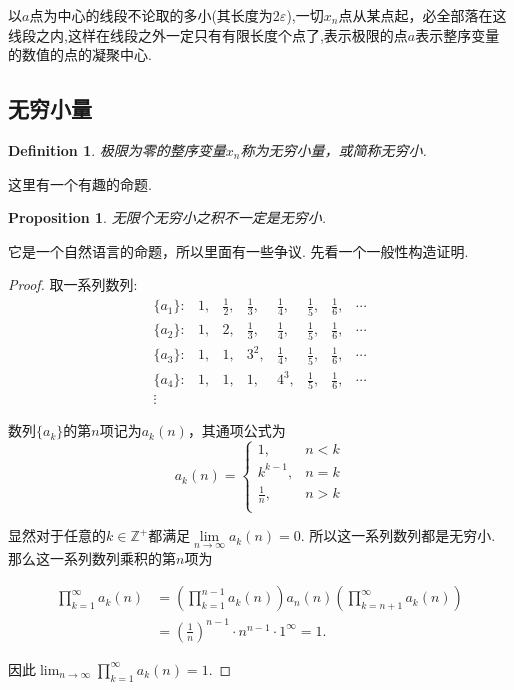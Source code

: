 \documentclass{article}
\newtheorem{proposition}[theorem]{Proposition}
\newtheorem{definition}[theorem]{Definition}
\begin{document}
以$a$点为中心的线段不论取的多小(其长度为$2\varepsilon$),一切$x_n$点从某点起，必全部落在这线段之内,这样在线段之外一定只有有限长度个点了,表示极限的点$a$表示整序变量的数值的点的凝聚中心.

\newpage
\subsection{无穷小量}

\begin{definition}
极限为零的整序变量$x_n$称为无穷小量，或简称无穷小.
\end{definition}

这里有一个有趣的命题.

\begin{proposition}
无限个无穷小之积不一定是无穷小.
\end{proposition}

它是一个自然语言的命题，所以里面有一些争议. 先看一个一般性构造证明.

\begin{proof}
取一系列数列: \\

$$
\begin{matrix} 
\{a_1\}:&1,&\frac12, & \frac13, &\frac14, & \frac15, & \frac16, &\cdots\\ \{a_2\}:&1,&2,&\frac13, &\frac14, &\frac15, &\frac16, &\cdots\\ \{a_3\}:&1,&1,&3^2, &\frac14, &\frac15, &\frac16, &\cdots\\ \{a_4\}:&1,&1,&1,&4^3,&\frac15, &\frac16, &\cdots\\ \vdots
\end{matrix}
$$

数列$\{a_k\}$的第$n$项记为$a_k(n)$，其通项公式为
$$
a_k(n)=\begin{cases} 1,&n<k\\ k^{k-1},&n=k\\ \frac1n,&n>k\\ \end{cases}
$$

显然对于任意的$k \in \mathbb{Z}^+$都满足$\lim\limits_{n\to\infty}a_k(n)=0$. 所以这一系列数列都是无穷小. 那么这一系列数列乘积的第$n$项为

\begin{align*}
\prod_{k=1}^\infty a_k(n) &=\left(\prod_{k=1}^{n-1}a_k(n)\right) a_n(n)\left(\prod_{k=n+1}^\infty a_k(n)\right) \\
&=\left(\frac1n\right)^{n-1}\cdot n^{n-1}\cdot1^\infty=1.
\end{align*}

因此$\lim_{n\to\infty}\prod_{k=1}^\infty a_k(n)=1$.
\end{proof}
\end{document}
